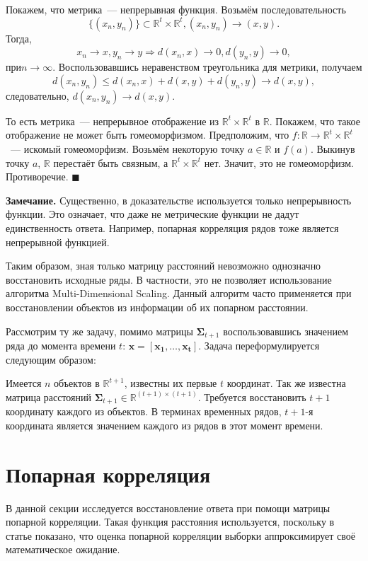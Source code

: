 \documentclass{article}
\begin{document}
Покажем, что метрика~--- непрерывная функция. Возьмём последовательность \[\{(x_n, y_n)\} \subset \mathbb{R}^t \times \mathbb{R}^t, (x_n, y_n) \to (x, y).\] Тогда, \[x_n\to x, y_n\to y \Rightarrow d(x_n,x)\to 0 ,d(y_n,y)\to 0,\] $при n \to \infty.$ Воспользовавшись неравенством треугольника для метрики, получаем \[d(x_n,y_n)\leqslant d(x_n,x)+d(x,y)+d(y_n,y)\to d(x,y),\] следовательно, $d(x_n,y_n)\to d(x,y)$.

То есть метрика~--- непрерывное отображение из $\mathbb{R}^t \times \mathbb{R}^t$ в $\mathbb{R}$. Покажем, что такое отображение не может быть гомеоморфизмом. Предположим, что $f: \mathbb{R} \to \mathbb{R}^t \times \mathbb{R}^t$~--- искомый гомеоморфизм. Возьмём некоторую точку $a \in \mathbb{R}$ и $f(a)$. Выкинув точку $a$, $\mathbb{R}$ перестаёт быть связным, а $\mathbb{R}^t \times \mathbb{R}^t$ нет. Значит, это не гомеоморфизм. Противоречие.
$\blacksquare$

\textbf{Замечание.} Существенно, в доказательстве используется только непрерывность функции. Это означает, что даже не метрические функции не дадут единственность ответа. Например, попарная корреляция рядов тоже является непрерывной функцией.

Таким образом, зная только матрицу расстояний невозможно однозначно восстановить исходные ряды. В частности, это не позволяет использование алгоритма Multi-Dimensional Scaling. Данный алгоритм часто применяется при восстановлении объектов из информации об их попарном расстоянии.

Рассмотрим ту же задачу, помимо матрицы $\mathbf{\Sigma}_{t+1}$ воспользовавшись значением ряда до момента времени $t$: $\mathbf{x}=[\mathbf{x_1}, \ldots, \mathbf{x_{t}}]$. Задача переформулируется следующим образом:

Имеется $n$ объектов в $\mathbb{R}^{t+1}$, известны их первые $t$ координат. Так же известна матрица расстояний $\mathbf{\Sigma}_{t+1} \in \mathbb{R}^{(t+1) \times (t+1)}$. Требуется восстановить $t+1$ координату каждого из объектов. В терминах временных рядов, $t+1$-я координата является значением каждого из рядов в этот момент времени.

\section{Попарная корреляция}

В данной секции исследуется восстановление ответа при помощи матрицы попарной корреляции. Такая функция расстояния используется, поскольку в статье \cite{puchkin2023sharper} показано, что оценка попарной корреляции выборки аппроксимирует своё математическое ожидание.
\end{document}
